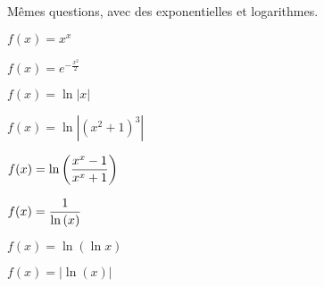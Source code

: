 \documentclass[a4paper, 11pt,reqno]{article}
\begin{document}
\begin{exercice}   \; M\^emes questions, avec des exponentielles et logarithmes.\\
	\begin{enumerate}
		\begin{minipage}[t]{0.45\textwidth}
			\item $f(x)=x^x$
			\item $f(x)=e^{-\frac{x^2}{2}}$
			\item $f(x)=\ln{|x|}$
			\item $f(x)=\ln{|(x^2+1)^3|}$
		\end{minipage}
		\begin{minipage}[t]{0.45\textwidth}
			\item $f(x)=\ln{\left(\displaystyle\frac{x^x-1}{x^x+1}  \right)}$
			\item $f(x)=\displaystyle\frac{1}{\ln{(x)}}$
			\item $f(x)=\ln{(\ln{x})}$
			\item $f(x)=|\ln{(x)}|$
		\end{minipage}
	\end{enumerate}
\end{exercice}
\end{document}
